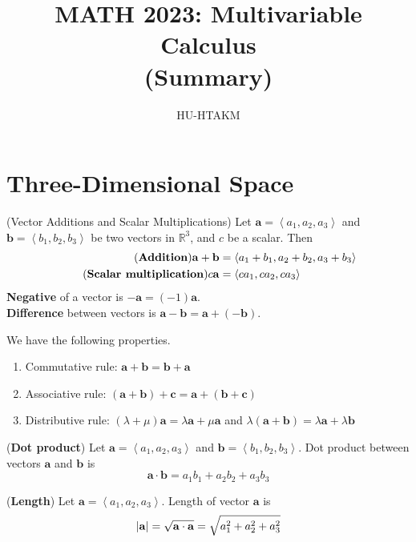 \documentclass{huhtakm-template-book}
\title{MATH 2023: Multivariable Calculus \\ (Summary)}
\author{HU-HTAKM}
\begin{document}
\maketitle
\chapter{Three-Dimensional Space}
\begin{defn}(Vector Additions and Scalar Multiplications)
    Let $\mathbf{a}=\left<a_{1},a_{2},a_{3}\right>$ and $\mathbf{b}=\left<b_{1},b_{2},b_{3}\right>$ be two vectors in $\mathbb{R}^{3}$, and $c$ be a scalar. Then
    \begin{align*}
        \tag{\textbf{Addition}}
        \mathbf{a}+\mathbf{b}&=\left<a_{1}+b_{1},a_{2}+b_{2},a_{3}+b_{3}\right>\\
        \tag{\textbf{Scalar multiplication}}
        c\mathbf{a}&=\left<ca_{1},ca_{2},ca_{3}\right>
    \end{align*}
    \textbf{Negative} of a vector is $-\mathbf{a}=(-1)\mathbf{a}$.\\
    \textbf{Difference} between vectors is $\mathbf{a}-\mathbf{b}=\mathbf{a}+(-\mathbf{b})$.
\end{defn}
\begin{lem}
    We have the following properties.
    \begin{enumerate}
        \item Commutative rule: $\mathbf{a}+\mathbf{b}=\mathbf{b}+\mathbf{a}$
        \item Associative rule: $(\mathbf{a}+\mathbf{b})+\mathbf{c}=\mathbf{a}+(\mathbf{b}+\mathbf{c})$
        \item Distributive rule: $(\lambda+\mu)\mathbf{a}=\lambda\mathbf{a}+\mu\mathbf{a}$ and $\lambda(\mathbf{a}+\mathbf{b})=\lambda\mathbf{a}+\lambda\mathbf{b}$
    \end{enumerate}
\end{lem}
\begin{defn}(\textbf{Dot product})
    Let $\mathbf{a}=\left<a_{1},a_{2},a_{3}\right>$ and $\mathbf{b}=\left<b_{1},b_{2},b_{3}\right>$. Dot product between vectors $\mathbf{a}$ and $\mathbf{b}$ is
    \begin{equation*}
        \mathbf{a}\cdot\mathbf{b}=a_{1}b_{1}+a_{2}b_{2}+a_{3}b_{3}
    \end{equation*}
\end{defn}
\begin{defn}(\textbf{Length})
    Let $\mathbf{a}=\left<a_{1},a_{2},a_{3}\right>$. Length of vector $\mathbf{a}$ is
    \begin{equation*}
        \left|{\mathbf{a}}\right|=\sqrt{\mathbf{a}\cdot\mathbf{a}}=\sqrt{a_{1}^{2}+a_{2}^{2}+a_{3}^{2}}
    \end{equation*}
\end{defn}
\end{document}
